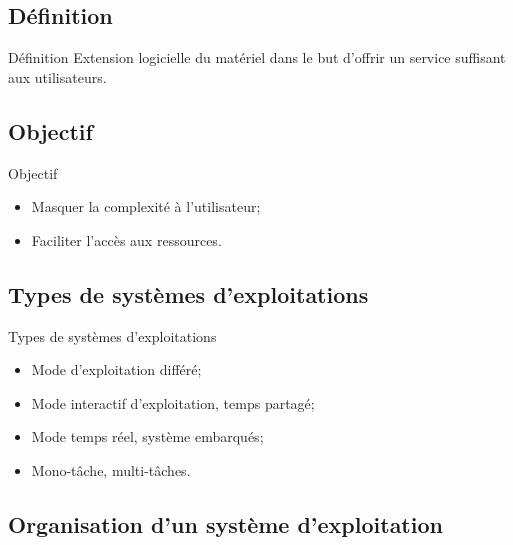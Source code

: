 \begin{frame}{\sectitle}

\def\subsectitle{Définition}
\subsection{\subsectitle}

\begin{exampleblock}{\subsectitle}
Extension logicielle du matériel dans le but d'offrir un service suffisant aux
utilisateurs.
\end{exampleblock}

\def\subsectitle{Objectif}
\subsection{\subsectitle}

\begin{block}{\subsectitle}
\begin{itemize}
    \item Masquer la complexité à l'utilisateur;
    \item Faciliter l'accès aux ressources.
\end{itemize}
\end{block}

\def\subsectitle{Types de systèmes d'exploitations}
\subsection{\subsectitle}

\begin{block}{\subsectitle}
\begin{itemize}
    \item Mode d'exploitation différé;
    \item Mode interactif d'exploitation, temps partagé;
    \item Mode temps réel, système embarqués;
    \item Mono-tâche, multi-tâches.
\end{itemize}
\end{block}
\end{frame}

\def\subsectitle{Organisation d'un système d'exploitation}
\subsection{\subsectitle}


